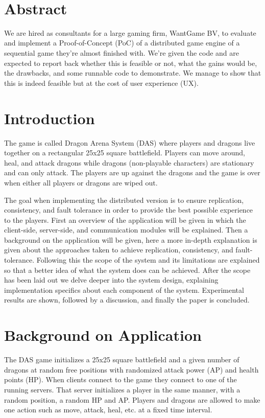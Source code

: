 \documentclass[a4paper]{article}
\author{\AuthorName}
\date{\small{\DueLang\ \DueDate}}
\title{
    \Class \\
    \Title \\
    \small\SubTitle
}
\begin{document}
\maketitle
\pagebreak

\section{Abstract}
We are hired as consultants for a large gaming firm, WantGame BV, to evaluate and implement a Proof-of-Concept (PoC) of a distributed game engine of a sequential game they're almost finished with. We're given the code and are expected to report back whether this is feasible or not, what the gains would be, the drawbacks, and some runnable code to demonstrate. We manage to show that this is indeed feasible but at the cost of user experience (UX).

\section{Introduction}
The game is called Dragon Arena System (DAS) where players and dragons live together on a rectangular 25x25 square battlefield. Players can move around, heal, and attack dragons while dragons (non-playable characters) are stationary and can only attack. The players are up against the dragons and the game is over when either all players or dragons are wiped out.

The goal when implementing the distributed version is to ensure replication, consistency, and fault tolerance in order to provide the best possible experience to the players. First an overview of the application will be given in which the client-side, server-side, and communication modules will be explained. Then a background on the application will be given, here a more in-depth explanation is given about the approaches taken to achieve replication, consistency, and fault-tolerance. Following this the scope of the system and its limitations are explained so that a better idea of what the system does can be achieved. After the scope has been laid out we delve deeper into the system design, explaining implementation specifics about each component of the system. Experimental results are shown, followed by a discussion, and finally the paper is concluded. 

\section{Background on Application}
The DAS game initializes a 25x25 square battlefield and a given number of dragons at random free positions with randomized attack power (AP) and health points (HP). When clients connect to the game they connect to one of the running servers. That server initializes a player in the same manner, with a random position, a random HP and AP. Players and dragons are allowed to make one action such as move, attack, heal, etc. at a fixed time interval. 
\end{document}
